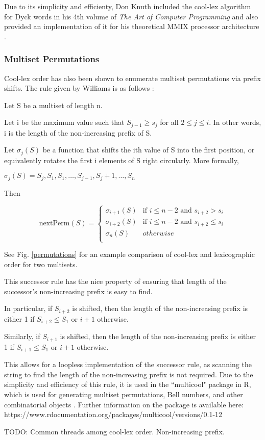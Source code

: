 Due to its simplicity and efficienty, Don Knuth included the cool-lex algorithm for Dyck words in his 4th volume of \emph{The Art of Computer Programming} and also provided an implementation of it for his theoretical MMIX processor architecture \cite{knuth2015art}.

\subsubsection{Multiset Permutations}

Cool-lex order has also been shown to enumerate multiset permutations via prefix shifts.  The rule given by Williams is as follows \cite{williams2009loopless}:
\bigskip

\noindent Let S be a multiset of length n.

\noindent Let i be the maximum value such that $S_{j-1} \ge s_j$ for all $2 \le j \le i$.  In other words, i is the length of the non-increasing prefix of S.  

\noindent Let $\sigma_j(S)$ be a function that shifts the ith value of S into the first position, or equivalently rotates the first i elements of S right circularly.  More formally, 

\noindent $\sigma_j(S)=S_j,S_1,S_1,\dots,S_{j-1},S_j+1,\dots,S_n $

Then

\begin{equation*}
    \text{nextPerm}(S) = \begin{cases}
	\sigma_{i+1}(S) & \text{if $i \le n-2$ and $s_{i+2} > s_i$}\\
	\sigma_{i+2}(S) & \text{if $i \le n-2$ and $s_{i+2} \le s_i$}\\
	\sigma_{n}(S) & otherwise\\
\end{cases}
\end{equation*}


See Fig. \ref{permutations} for an example comparison of cool-lex and lexicographic order for two multisets.

This successor rule has the nice property of ensuring that length of the successor's non-increasing prefix is easy to find.

In particular, if $S_{i+2}$ is shifted, then the length of the non-increasing prefix is either 1 if $S_{i+2}\le S_1$ or $i+1$ otherwise. 

Similarly, if $S_{i+1}$ is shifted, then the length of the non-increasing prefix is either 1 if $S_{i+1}\le S_1$ or $i+1$ otherwise. 

This allows for a loopless implementation of the successor rule, as scanning the string to find the length of the non-increasing prefix is not required.  Due to the simplicity and efficiency of this rule, it is used in the ``multicool" package in R, which is used for generating multiset permutations, Bell numbers, and other combinatorial objects \cite{multicool_2021}.   Further information on the package is available here: https://www.rdocumentation.org/packages/multicool/versions/0.1-12

TODO: Common threads among cool-lex order. Non-increasing prefix. 

% 

